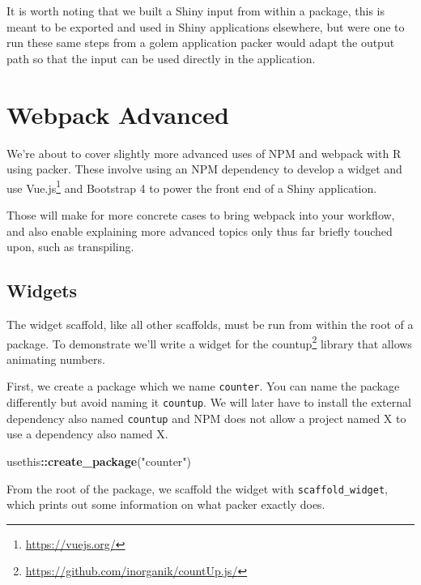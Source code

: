 \documentclass[10pt,]{krantz}
\makeatletter
\newenvironment{Shaded}{\begin{snugshade}}{\end{snugshade}}
\newcommand{\KeywordTok}[1]{\textcolor[rgb]{0.27,0.27,0.27}{\textbf{#1}}}
\newcommand{\NormalTok}[1]{#1}
\newcommand{\OperatorTok}[1]{\textcolor[rgb]{0.43,0.43,0.43}{\textbf{#1}}}
\newcommand{\StringTok}[1]{\textcolor[rgb]{0.5,0.5,0.5}{#1}}
\renewcommand{\href}[2]{#2\footnote{\url{#1}}}
\newenvironment{kframe}{%
\medskip{}
\setlength{\fboxsep}{.8em}
 \def\at@end@of@kframe{}%
 \ifinner\ifhmode%
  \def\at@end@of@kframe{\end{minipage}}%
  \begin{minipage}{\columnwidth}%
 \fi\fi%
 \def\FrameCommand##1{\hskip\@totalleftmargin \hskip-\fboxsep
 \colorbox{shadecolor}{##1}\hskip-\fboxsep
     \hskip-\linewidth \hskip-\@totalleftmargin \hskip\columnwidth}%
 \MakeFramed {\advance\hsize-\width
   \@totalleftmargin\z@ \linewidth\hsize
   \@setminipage}}%
 {\par\unskip\endMakeFramed%
 \at@end@of@kframe}
\renewenvironment{Shaded}{\begin{kframe}}{\end{kframe}}
\makeatother
\begin{document}
It is worth noting that we built a Shiny input from within a package, this is meant to be exported and used in Shiny applications elsewhere, but were one to run these same steps from a golem application packer would adapt the output path so that the input can be used directly in the application.

\hypertarget{packer-adv}{%
\chapter{Webpack Advanced}\label{packer-adv}}

We're about to cover slightly more advanced uses of NPM and webpack with R using packer. These involve using an NPM dependency to develop a widget and use \href{https://vuejs.org/}{Vue.js} and Bootstrap 4 to power the front end of a Shiny application.

Those will make for more concrete cases to bring webpack into your workflow, and also enable explaining more advanced topics only thus far briefly touched upon, such as transpiling.

\hypertarget{packer-adv-widgets}{%
\section{Widgets}\label{packer-adv-widgets}}

The widget scaffold, like all other scaffolds, must be run from within the root of a package. To demonstrate we'll write a widget for the \href{https://github.com/inorganik/countUp.js/}{countup} library that allows animating numbers.

First, we create a package which we name \texttt{counter}. You can name the package differently but avoid naming it \texttt{countup}. We will later have to install the external dependency also named \texttt{countup} and NPM does not allow a project named X to use a dependency also named X.

\begin{Shaded}
\begin{Highlighting}[]
\NormalTok{usethis}\OperatorTok{::}\KeywordTok{create_package}\NormalTok{(}\StringTok{"counter"}\NormalTok{)}
\end{Highlighting}
\end{Shaded}

From the root of the package, we scaffold the widget with \texttt{scaffold\_widget}, which prints out some information on what packer exactly does.
\end{document}

